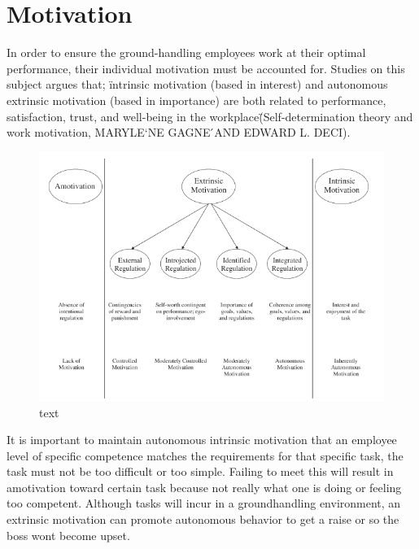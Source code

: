 \section{Motivation}

In order to ensure the ground-handling employees work at their optimal performance, their individual motivation must be accounted for. Studies on this subject argues that; \"intrinsic motivation (based in interest) and autonomous extrinsic motivation (based in importance) are both related to performance, satisfaction, trust, and well-being in the workplace\" (Self-determination theory and work motivation, MARYLE`NE GAGNE ́AND EDWARD L. DECI).

\begin{figure}
\centering
\includegraphics{Grafik/Motivation}
\caption{text}
\label{Hackman}
\end{figure}

It is important to maintain autonomous intrinsic motivation that an employee level of specific competence matches the requirements for that specific task, the task must not be too difficult or too simple. Failing to meet this will result in amotivation toward certain task because not really what one is doing or feeling too competent. Although tasks will incur in a groundhandling environment, an extrinsic motivation can promote autonomous behavior to get a raise or so the boss wont become upset.

